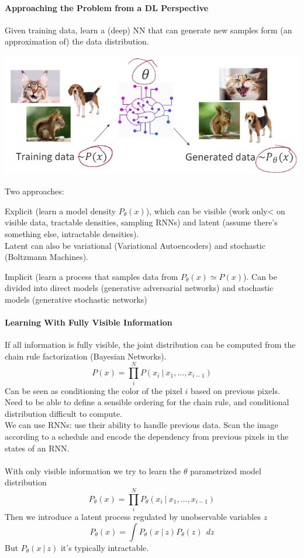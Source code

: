 \documentclass[10pt]{report}
\begin{document}
\paragraph{Approaching the Problem from a DL Perspective} Given training data, learn a (deep) NN that can generate new samples form (an approximation of) the data distribution.\begin{center}
	\includegraphics[scale=0.5]{139.png}
\end{center}
Two approaches:
\begin{list}{}{}
	\item Explicit (learn a model density $P_\theta(x)$), which can be visible (work only< on visible data, tractable densities, sampling RNNs) and latent (assume there's something else, intractable densities).\\
	Latent can also be variational (Variational Autoencoders) and stochastic (Boltzmann Machines).
	\item Implicit (learn a process that samples data from $P_\theta(x)\simeq P(x)$). Can be divided into direct models (generative adversarial networks) and stochastic models (generative stochastic networks)
\end{list}
\paragraph{Learning With Fully Visible Information} If all information is fully visible, the joint distribution can be computed from the chain rule factorization (Bayesian Networks).
$$P(x)=\prod_i^NP(x_i\:|\:x_1,\ldots,x_{i-1})$$
Can be seen as conditioning the color of the pixel $i$ based on previous pixels. Need to be able to define a sensible ordering for the chain rule, and conditional distribution difficult to compute.\\
We can use RNNs: use their ability to handle previous data. Scan the image according to a schedule and encode the dependency from previous pixels in the states of an RNN.\\\\
With only visible information we try to learn the $\theta$ parametrized model distribution
$$P_\theta(x)=\prod_i^NP_\theta(x_i\:|\:x_1,\ldots,x_{i-1})$$
Then we introduce a latent process regulated by unobservable variables $z$
$$P_\theta(x)=\int P_\theta(x\:|\:z)P_\theta(z)\:\:dz$$
But $P_\theta(x\:|\:z)$ it's typically intractable.
\end{document}
